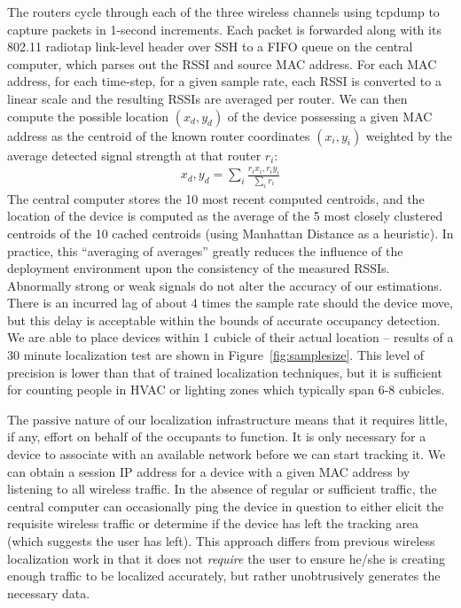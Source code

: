 The routers cycle through each of the three wireless channels using tcpdump to capture packets in 1-second increments. Each packet is forwarded along with its 802.11 radiotap link-level header over SSH to a FIFO queue on the central computer, which parses out the RSSI and source MAC address. For each MAC address, for each time-step, for a given sample rate, each RSSI is converted to a linear scale and the resulting RSSIs are averaged per router. We can then compute the possible location $(x_d,y_d)$ of the device possessing a given MAC address as the centroid of the known router coordinates $(x_i, y_i)$ weighted by the average detected signal strength at that router $r_i$:
\begin{equation}
\begin{split}
x_d, y_d = \displaystyle\sum_{i} \frac{r_ix_i, r_iy_i}{\displaystyle\sum_i r_i}
\end{split}
\end{equation}
The central computer stores the 10 most recent computed centroids, and the location of the device is computed as the average of the 5 most closely clustered centroids of the 10 cached centroids (using Manhattan Distance as a heuristic). In practice, this ``averaging of averages'' greatly reduces the influence of the deployment environment upon the consistency of the measured RSSIs. Abnormally strong or weak signals do not alter the accuracy of our estimations. There is an incurred lag of about 4 times the sample rate should the device move, but this delay is acceptable within the bounds of accurate occupancy detection. We are able to place devices within 1 cubicle of their actual location -- results of a 30 minute localization test are shown in Figure~\ref{fig:samplesize}. This level of precision is lower than that of trained localization techniques, but it is sufficient for counting people in HVAC or lighting zones which typically span 6-8 cubicles.

The passive nature of our localization infrastructure means that it requires little, if any, effort on behalf of the occupants to function. It is only necessary for a device to associate with an available network before we can start tracking it. We can obtain a session IP address for a device with a given MAC address by listening to all wireless traffic. In the absence of regular or sufficient traffic, the central computer can occasionally ping the device in question to either elicit the requisite wireless traffic or determine if the device has left the tracking area (which suggests the user has left). This approach differs from previous wireless localization work in that it does not \emph{require} the user to ensure he/she is creating enough traffic to be localized accurately, but rather unobtrusively generates the necessary data. 

